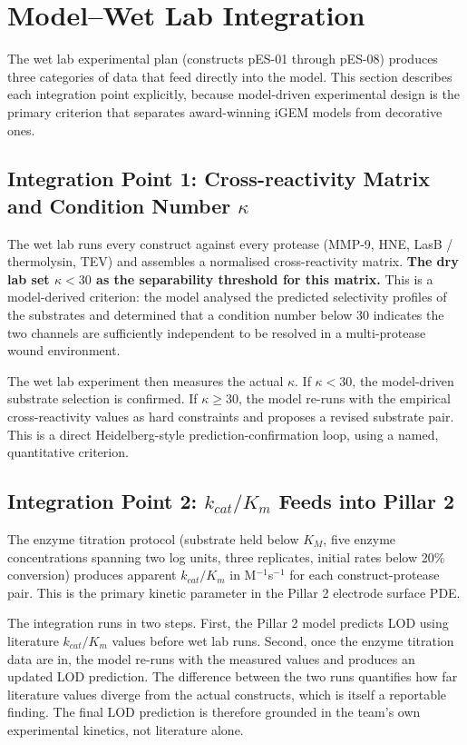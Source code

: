 \documentclass[10pt,a4paper]{article}
\begin{document}
\section{Model--Wet Lab Integration}

The wet lab experimental plan (constructs pES-01 through pES-08) produces
three categories of data that feed directly into the model.  This section
describes each integration point explicitly, because model-driven experimental
design is the primary criterion that separates award-winning iGEM models from
decorative ones.

\subsection{Integration Point 1: Cross-reactivity Matrix and Condition Number $\kappa$}

The wet lab runs every construct against every protease (MMP-9, HNE, LasB / thermolysin,
TEV) and assembles a normalised cross-reactivity matrix.
\textbf{The dry lab set $\kappa < 30$ as the separability threshold for this matrix.}
This is a model-derived criterion: the model analysed the predicted selectivity
profiles of the substrates and determined that a condition number below 30
indicates the two channels are sufficiently independent to be resolved in a
multi-protease wound environment.

The wet lab experiment then measures the actual $\kappa$.  If $\kappa < 30$,
the model-driven substrate selection is confirmed.  If $\kappa \geq 30$, the
model re-runs with the empirical cross-reactivity values as hard constraints
and proposes a revised substrate pair.  This is a direct Heidelberg-style
prediction-confirmation loop, using a named, quantitative criterion.

\subsection{Integration Point 2: $k_{cat}/K_m$ Feeds into Pillar 2}

The enzyme titration protocol (substrate held below $K_M$, five enzyme
concentrations spanning two log units, three replicates, initial rates below
20\% conversion) produces apparent $k_{cat}/K_m$ in M$^{-1}$s$^{-1}$ for
each construct-protease pair.  This is the primary kinetic parameter in the
Pillar 2 electrode surface PDE.

The integration runs in two steps.  First, the Pillar 2 model predicts LOD
using literature $k_{cat}/K_m$ values before wet lab runs.  Second, once
the enzyme titration data are in, the model re-runs with the measured values
and produces an updated LOD prediction.  The difference between the two runs
quantifies how far literature values diverge from the actual constructs, which
is itself a reportable finding.  The final LOD prediction is therefore
grounded in the team's own experimental kinetics, not literature alone.
\end{document}
